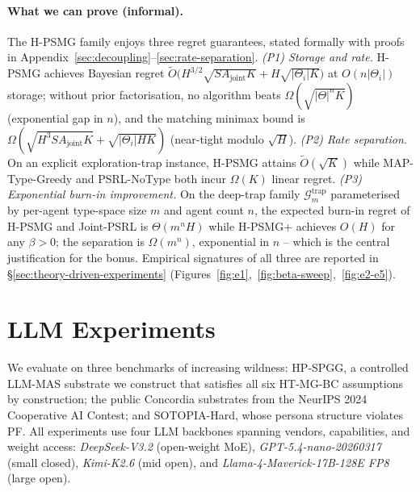 ﻿\documentclass{article}
\def\textsuperscript#1{#1}%
\begin{document}
\paragraph{What we can prove (informal).} The H-PSMG family enjoys three regret guarantees, stated formally with proofs in Appendix~\ref{sec:decoupling}--\ref{sec:rate-separation}. \emph{(P1) Storage and rate.} H-PSMG achieves Bayesian regret $\tilde O\!\big(H^{3/2}\sqrt{SA_{\mathrm{joint}}K} + H\sqrt{|\Theta_i|K}\big)$ at $O(n|\Theta_i|)$ storage; without prior factorisation, no algorithm beats $\Omega(\sqrt{|\Theta|^n K})$ (exponential gap in $n$), and the matching minimax bound is $\Omega(\sqrt{H^3 SA_{\mathrm{joint}}K} + \sqrt{|\Theta_i|HK})$ (near-tight modulo $\sqrt H$). \emph{(P2) Rate separation.} On an explicit exploration-trap instance, H-PSMG attains $\tilde O(\sqrt K)$ while MAP-Type-Greedy and PSRL-NoType both incur $\Omega(K)$ linear regret. \emph{(P3) Exponential burn-in improvement.} On the deep-trap family $\mathcal G_m^{\mathrm{trap}}$ parameterised by per-agent type-space size $m$ and agent count $n$, the expected burn-in regret of H-PSMG and Joint-PSRL is $\Theta(m^n H)$ while H-PSMG\textsuperscript{+} achieves $O(H)$ for any $\beta\!>\!0$; the separation is $\Omega(m^n)$, exponential in $n$ -- which is the central justification for the bonus. Empirical signatures of all three are reported in \S\ref{sec:theory-driven-experiments} (Figures~\ref{fig:e1},~\ref{fig:beta-sweep},~\ref{fig:e2-e5}).

\section{LLM Experiments}
\label{sec:experiments-llm}

We evaluate on three benchmarks of increasing wildness: HP-SPGG, a controlled LLM-MAS substrate we construct that satisfies all six HT-MG-BC assumptions by construction; the public Concordia substrates from the NeurIPS 2024 Cooperative AI Contest; and SOTOPIA-Hard, whose persona structure violates PF. All experiments use four LLM backbones spanning vendors, capabilities, and weight access: \emph{DeepSeek-V3.2} (open-weight MoE), \emph{GPT-5.4-nano-20260317} (small closed), \emph{Kimi-K2.6} (mid open), and \emph{Llama-4-Maverick-17B-128E FP8} (large open).
\end{document}
